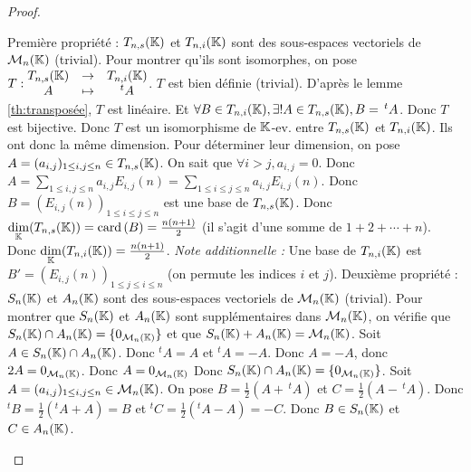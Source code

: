 \documentclass[12pt,a4paper]{report}
\begin{document}
\begin{proof}
    \begin{outline}
        \1 Première propriété :
            \2 $T_{n,s}(\mathbb{K})$ et $T_{n,i}(\mathbb{K})$ sont des sous-espaces vectoriels de $\mathcal M_n(\mathbb{K})$ (trivial).
            \2 Pour montrer qu'ils sont isomorphes, on pose $T: \begin{matrix} T_{n,s}(\mathbb{K}) &\to &T_{n,i}(\mathbb{K}) \\ A &\mapsto &^tA \end{matrix}$.
            \3 $T$ est bien définie (trivial).
            \3 D'après le lemme \ref{th:transposée}, $T$ est linéaire.
            \3 Et $\forall B \in T_{n,i}(\mathbb{K}), \exists ! A \in T_{n,s}(\mathbb{K}), B = \,^tA$. Donc $T$ est bijective.
            \2 Donc $T$ est un isomorphisme de $\mathbb{K}$-ev. entre $T_{n,s}(\mathbb{K})$ et $T_{n,i}(\mathbb{K})$.
            \2 Ils ont donc la même dimension.
            \2 Pour déterminer leur dimension, on pose $A = (a_{i,j})_{1 \le i,j \le n} \in T_{n,s}(\mathbb{K})$.
            \2 On sait que $\forall i > j, a_{i,j} = 0$.
            \2 Donc $A = \sum_{1 \le i,j \le n} a_{i,j} E_{i,j}(n) = \sum_{1 \le i \le j \le n} a_{i,j} E_{i,j}(n)$.
            \2 Donc $B = (E_{i,j}(n))_{1 \le i \le j \le n}$ est une base de $T_{n,s}(\mathbb{K})$.
            \2 Donc $\underset{\mathbb{K}}\dim(T_{n,s}(\mathbb{K})) = \mathrm{card}\left(B\right) = \frac{n(n+1)}{2}$ (il s'agit d'une somme de $1 + 2 + \cdots + n$).
            \2 Donc $\underset{\mathbb{K}}\dim(T_{n,i}(\mathbb{K})) = \frac{n(n+1)}{2}$.
            \2 \textit{Note additionnelle :} Une base de $T_{n,i}(\mathbb{K})$ est $B' = (E_{i,j}(n))_{1 \le j \le i \le n}$ (on permute les indices $i$ et $j$).
        \1 Deuxième propriété :
            \2 $S_n(\mathbb{K})$ et $A_n(\mathbb{K})$ sont des sous-espaces vectoriels de $\mathcal M_n(\mathbb{K})$ (trivial).
            \2 Pour montrer que $S_n(\mathbb{K})$ et $A_n(\mathbb{K})$ sont supplémentaires dans $\mathcal M_n(\mathbb{K})$, on vérifie que $S_n(\mathbb{K}) \cap A_n(\mathbb{K}) = \{0_{\mathcal M_n(\mathbb{K})}\}$ et que $S_n(\mathbb{K}) + A_n(\mathbb{K}) = \mathcal M_n(\mathbb{K})$.
            \3 Soit $A \in S_n(\mathbb{K}) \cap A_n(\mathbb{K})$. Donc $^tA = A$ et $^tA = -A$.
            \3 Donc $A = -A$, donc $2A = 0_{\mathcal M_n(\mathbb{K})}$.
            \3 Donc $A = 0_{\mathcal M_n(\mathbb{K})}$
            \3 Donc $S_n(\mathbb{K}) \cap A_n(\mathbb{K}) = \{0_{\mathcal M_n(\mathbb{K})}\}$.
            \3 Soit $A = (a_{i,j})_{1 \le i,j \le n} \in \mathcal M_n(\mathbb{K})$.
            \3 On pose $B = \frac{1}{2}(A + \,^tA)$ et $C = \frac{1}{2}(A - \,^tA)$.
            \3 Donc $^tB = \frac{1}{2}(^tA + A) = B$ et $^tC = \frac{1}{2}(^tA - A) = -C$.
            \3 Donc $B \in S_n(\mathbb{K})$ et $C \in A_n(\mathbb{K})$.

\end{outline}
\end{proof}
\end{document}
